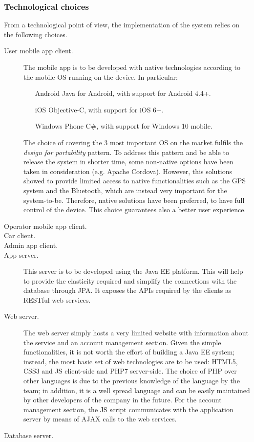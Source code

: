 \subsubsection{Technological choices}
	From a technological point of view, the implementation of the system relies on the following choices.
	\begin{description}
		\item[User mobile app client.] The mobile app is to be developed with native technologies according to the mobile OS running on the device. In particular:
			\begin{itemize}
				\item[Android] Java for Android, with support for Android 4.4+.
				\item[iOS] Objective-C, with support for iOS 6+.
				\item[Windows Phone] C\#, with support for Windows 10 mobile.
			\end{itemize}
		The choice of covering the 3 most important OS on the market fulfils the \textit{design for portability} pattern. To address this pattern and be able to release the system in shorter time, some non-native options have been taken in consideration (e.g. Apache Cordova). However, this solutions showed to provide limited access to native functionalities such as the GPS system and the Bluetooth, which are instead very important for the system-to-be. Therefore, native solutions have been preferred, to have full control of the device. This choice guarantees also a better user experience.

		\item[Operator mobile app client.] %

		\item[Car client.] %

		\item[Admin app client.] %

		\item[App server.] This server is to be developed using the Java EE platform. This will help to provide the elasticity required and simplify the connections with the database through JPA. It exposes the APIs required by the clients as RESTful web services.

		\item[Web server.] The web server simply hosts a very limited website with information about the service and an account management section. Given the simple functionalities, it is not worth the effort of building a Java EE system; instead, the most basic set of web technologies are to be used: HTML5, CSS3 and JS client-side and PHP7 server-side. The choice of PHP over other languages is due to the previous knowledge of the language by the team; in addition, it is a well spread language and can be easily maintained by other developers of the company in the future. For the account management section, the JS script communicates with the application server by means of AJAX calls to the web services.

		\item[Database server.] %
	\end{description}

